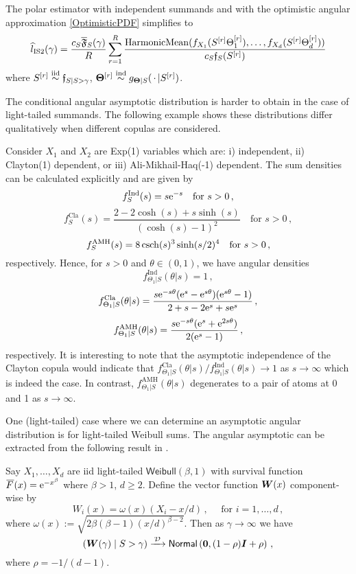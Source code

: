 \begin{remark}
The polar estimator with independent summands and with the optimistic angular approximation \eqref{OptimisticPDF} simplifies to
\[
\widehat{l}_{\mathrm{IS2}}(\gamma)
= \frac{c_S \overline{\mathfrak{F}}_S(\gamma)}{R} \sum_{r=1}^R \frac{\mathrm{HarmonicMean}( f_{X_1}( S^{[r]} \Theta^{[r]}_1), \dots, f_{X_d}( S^{[r]} \Theta^{[r]}_d) )}{c_S \mathfrak{f}_S( S^{[r]} )}
\]
where $S^{[r]} \overset{\smash{\mathrm{iid}}}{\sim} \mathfrak{f}_{S|S>\gamma}$, $\bm{\Theta}^{[r]} \overset{\smash{\mathrm{ind}}}{\sim} g_{\bm{\Theta} \mid S}( \,\cdot\, | S^{[r]})$. \remQED
\end{remark}

The conditional angular asymptotic distribution is harder to obtain in the case of light-tailed summands. The following example shows these distributions differ qualitatively when different copulas are considered.

\begin{example}
Consider $X_1$ and $X_2$ are \textsf{Exp}(1) variables which are: i) independent, ii) \textsf{Clayton}(1) dependent, or iii) \textsf{Ali-Mikhail-Haq}(-1) dependent. The sum densities can be calculated explicitly and
are given by
\[ f_S^{\mathrm{Ind}}(s) = s \mathrm{e}^{-s} \quad \text{for } s > 0 \,, \]
\[ f_S^{\mathrm{Cla}}(s) = \frac{2 - 2 \cosh(s) + s \sinh(s)}{(\cosh(s)-1)^2} \quad \text{for } s > 0 \,, \]
\[ f_S^{\mathrm{AMH}}(s) = 8 \operatorname{csch}(s)^3 \sinh(s/2)^4 \quad \text{for } s > 0 \,, \]
respectively.
Hence, for $s>0$ and $\theta \in (0,1)$, we have angular densities
\[ f^{\mathrm{Ind}}_{\Theta_1 | S}(\theta | s) = 1 \,, \]
\[ f^{\mathrm{Cla}}_{\Theta_1 | S}(\theta | s) = \frac{ s \mathrm{e}^{-s \theta}(\mathrm{e}^s - \mathrm{e}^{s \theta})(\mathrm{e}^{s \theta}-1)}{2 + s - 2\mathrm{e}^s + s \mathrm{e}^s} \,, \]
\[ f^{\mathrm{AMH}}_{\Theta_1 | S}(\theta | s) = \frac{ s \mathrm{e}^{-s \theta}(\mathrm{e}^s + \mathrm{e}^{2 s \theta})}{2(\mathrm{e}^s - 1)} \,,  \]
respectively. It is interesting to note that the asymptotic independence of the Clayton copula would indicate that $f^{\mathrm{Cla}}_{\Theta_1 | S}(\theta | s) / f^{\mathrm{Ind}}_{\Theta_1 | S}(\theta | s) \to 1$ as $s\to\infty$ which is indeed the case. In contrast, $f^{\mathrm{AMH}}_{\Theta_1 | S}(\theta | s)$ degenerates to a pair of atoms at 0 and 1 as $s \to \infty$.
\end{example}

One (light-tailed) case where we can determine an asymptotic angular distribution is for light-tailed Weibull sums. The angular asymptotic can be extracted from the following result in \cite{asmussen2017tail}.

\begin{proposition} \label{prop:light_weibull_angles}
Say $X_1, \dots, X_d$ are iid light-tailed $\mathsf{Weibull}(\beta, 1)$ with survival function $\Ftail(x)=\e^{-x^\beta}$ where $\beta>1$, $d \ge 2$.
Define the vector function $\bm{W}(x)$ component-wise by
\[ W_i(x) = \omega(x) ( X_i - x/d) \,, \quad \text{ for } i=1,\dots,d\,, \]
where $\omega(x) := \sqrt{2  \beta (\beta-1) (x/d)^{\beta-2}}$.
Then as $\gamma \to \infty$ we have
\[ (\bm{W}(\gamma) \mid S > \gamma) \xrightarrow{\:\smash{\mathcal{D}}\:} \mathsf{Normal}\left(\bm{0}, (1 - \rho) \bm{I} + \rho \right) \,,\]
where $\rho = -1/(d-1)$.
\end{proposition}

